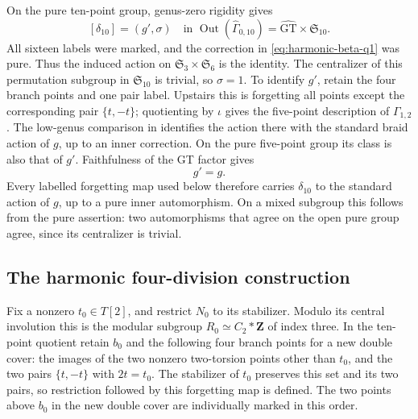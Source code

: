 On the pure ten-point group, genus-zero rigidity
\cite[Definition~2.7 and Corollary~2.8(i)]{CubicHMM} gives
\[
 [\delta_{10}]=(g',\sigma)
 \quad\text{in }\operatorname{Out}(\widehat\Gamma_{0,10})
       =\widehat{\mathrm{GT}}\times\mathfrak S_{10}.
\]
All sixteen labels were marked, and the correction in \eqref{eq:harmonic-beta-q1}
was pure. Thus the induced action on
\(\mathfrak S_3\times\mathfrak S_6\) is the identity.
The centralizer of this permutation subgroup in
\(\mathfrak S_{10}\) is trivial, so \(\sigma=1\).
To identify \(g'\), retain the four branch points and one
pair label. Upstairs this is forgetting all points except
the corresponding pair \(\{t,-t\}\); quotienting by
\(\iota\) gives the five-point description of
\(\Gamma_{1,2}\). The low-genus comparison in
\cite[Lemma~17(b)]{H17} identifies the action there with
the standard braid action of \(g\), up to an inner
correction. On the pure five-point group its class is also
that of \(g'\). Faithfulness of the GT factor gives
\begin{equation}
                         g'=g.                             \label{eq:harmonic-beta-q3}
\end{equation}
Every labelled forgetting map used below therefore carries
\(\delta_{10}\) to the standard action of \(g\), up to a
pure inner automorphism. On a mixed subgroup this follows
from the pure assertion: two automorphisms that agree on
the open pure group agree, since its centralizer is trivial.

\subsection{The harmonic four-division construction}

Fix a nonzero \(t_0\in T[2]\), and restrict \(N_0\) to its
stabilizer. Modulo its central involution this is the modular
subgroup \(R_0\simeq C_2*\mathbf Z\) of index three.
In the ten-point quotient retain \(b_0\) and the following
four branch points for a new double cover: the images of
the two nonzero two-torsion points other than \(t_0\), and
the two pairs \(\{t,-t\}\) with \(2t=t_0\).
The stabilizer of \(t_0\) preserves this set and its two
pairs, so restriction followed by this forgetting map is
defined. The two points above \(b_0\) in the new double cover
are individually marked in this order.

